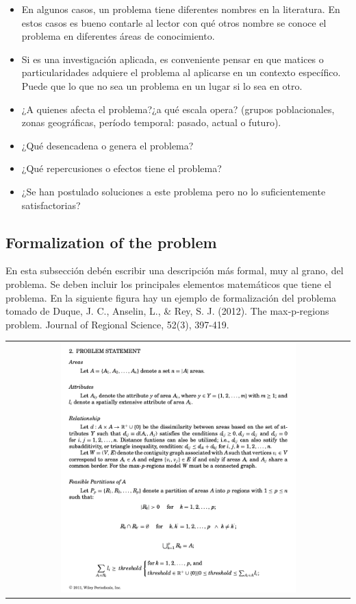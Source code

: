 \documentclass[12pt,letterpaper]{article}
\begin{document}
\begin{itemize}
\item En algunos casos, un problema tiene diferentes nombres en la literatura. En estos casos es bueno contarle al lector con qué otros nombre se conoce el problema en diferentes áreas de conocimiento.
\item Si es una investigación aplicada, es conveniente pensar en que matices o particularidades adquiere el problema al aplicarse en un contexto específico. Puede que lo que no sea un problema en un lugar si lo sea en otro.
\item ¿A quienes afecta el problema?¿a qué escala opera? (grupos poblacionales, zonas geográficas, período temporal: pasado, actual o futuro).
\item ¿Qué desencadena o genera el problema?
\item ¿Qué repercusiones o efectos tiene el problema?
\item ¿Se han postulado soluciones a este problema pero no lo suficientemente satisfactorias?
\end{itemize}


\subsection{Formalization of the problem}

En esta subsección debén escribir una descripción más formal, muy al grano,
del problema.  Se deben incluir los principales elementos matemáticos que
tiene el problema.  En la siguiente figura hay un ejemplo de formalización del
problema tomado de Duque, J. C., Anselin, L., \& Rey, S. J. (2012). The
max‐p‐regions problem. Journal of Regional Science, 52(3), 397-419.


 \begin{center}
  \begin{tabular}{c}
    \includegraphics[width=0.70\textwidth]{problem_statement}
  \end{tabular}
\end{center}
\end{document}
